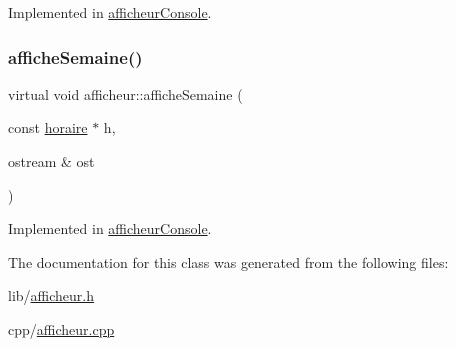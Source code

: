 Implemented in \hyperlink{classafficheur_console_a1da9c74956f87ee2103dae0ca49d58d2}{afficheur\+Console}.

\hypertarget{classafficheur_a1551534b5916a48d3ea73f0d68929e95}{}\label{classafficheur_a1551534b5916a48d3ea73f0d68929e95} 
\subsubsection{\texorpdfstring{affiche\+Semaine()}{afficheSemaine()}}
{\footnotesize\ttfamily virtual void afficheur\+::affiche\+Semaine (\begin{DoxyParamCaption}\item[{const \hyperlink{classhoraire}{horaire} $\ast$}]{h,  }\item[{ostream \&}]{ost }\end{DoxyParamCaption})\hspace{0.3cm}{\ttfamily [pure virtual]}}



Implemented in \hyperlink{classafficheur_console_a0930128cabb9b2585db0140f7614a3df}{afficheur\+Console}.



The documentation for this class was generated from the following files\+:\begin{DoxyCompactItemize}
\item 
lib/\hyperlink{afficheur_8h}{afficheur.\+h}\item 
cpp/\hyperlink{afficheur_8cpp}{afficheur.\+cpp}\end{DoxyCompactItemize}
